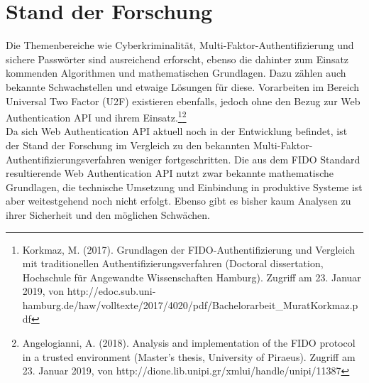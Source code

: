 \chapter{Stand der Forschung}

Die Themenbereiche wie Cyberkriminalität, Multi-Faktor-Authentifizierung und sichere Passwörter sind ausreichend erforscht, ebenso die dahinter zum Einsatz kommenden Algorithmen und mathematischen Grundlagen. Dazu zählen auch bekannte Schwachstellen und etwaige Lösungen für diese. Vorarbeiten im Bereich Universal Two Factor (U2F) existieren ebenfalls, jedoch ohne den Bezug zur Web Authentication API und ihrem Einsatz.\footnote{Korkmaz, M. (2017). Grundlagen der FIDO-Authentifizierung und Vergleich mit traditionellen Authentifizierungsverfahren (Doctoral dissertation, Hochschule für Angewandte Wissenschaften Hamburg). Zugriff am 23. Januar 2019, von http://edoc.sub.uni-hamburg.de/haw/volltexte/2017/4020/pdf/Bachelorarbeit\_MuratKorkmaz.pdf}\footnote{Angelogianni, A. (2018). Analysis and implementation of the FIDO protocol in a trusted environment (Master's thesis, University of Piraeus). Zugriff am 23. Januar 2019, von http://dione.lib.unipi.gr/xmlui/handle/unipi/11387}\\

Da sich Web Authentication API aktuell noch in der Entwicklung befindet, ist der Stand der Forschung im Vergleich zu den bekannten Multi-Faktor-Authentifizierungsverfahren weniger fortgeschritten. Die aus dem FIDO Standard resultierende Web Authentication API nutzt zwar bekannte mathematische Grundlagen, die technische Umsetzung und Einbindung in produktive Systeme ist aber weitestgehend noch nicht erfolgt. Ebenso gibt es bisher kaum Analysen zu ihrer Sicherheit und den möglichen Schwächen.